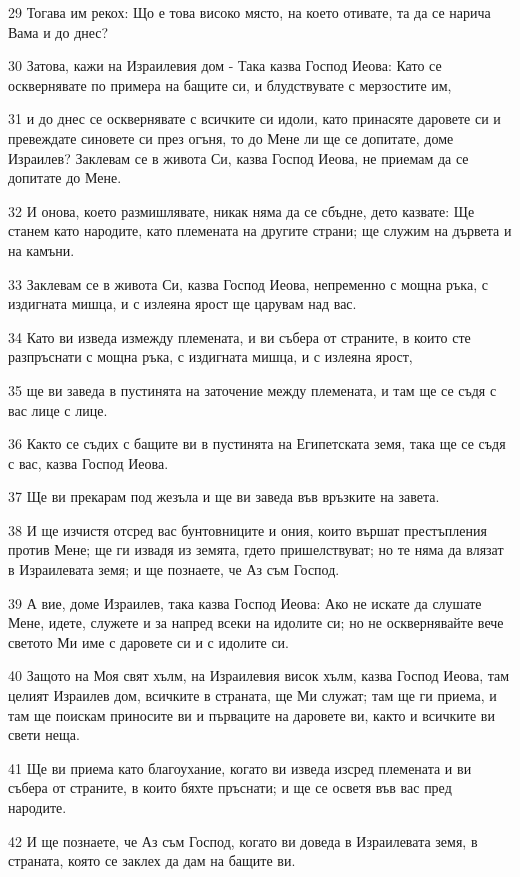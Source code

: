 \par 29 Тогава им рекох: Що е това високо място, на което отивате, та да се нарича Вама и до днес?
\par 30 Затова, кажи на Израилевия дом - Така казва Господ Иеова: Като се осквернявате по примера на бащите си, и блудствувате с мерзостите им,
\par 31 и до днес се осквернявате с всичките си идоли, като принасяте даровете си и превеждате синовете си през огъня, то до Мене ли ще се допитате, доме Израилев? Заклевам се в живота Си, казва Господ Иеова, не приемам да се допитате до Мене.
\par 32 И онова, което размишлявате, никак няма да се сбъдне, дето казвате: Ще станем като народите, като племената на другите страни; ще служим на дървета и на камъни.
\par 33 Заклевам се в живота Си, казва Господ Иеова, непременно с мощна ръка, с издигната мишца, и с излеяна ярост ще царувам над вас.
\par 34 Като ви изведа измежду племената, и ви събера от страните, в които сте разпръснати с мощна ръка, с издигната мишца, и с излеяна ярост,
\par 35 ще ви заведа в пустинята на заточение между племената, и там ще се съдя с вас лице с лице.
\par 36 Както се съдих с бащите ви в пустинята на Египетската земя, така ще се съдя с вас, казва Господ Иеова.
\par 37 Ще ви прекарам под жезъла и ще ви заведа във връзките на завета.
\par 38 И ще изчистя отсред вас бунтовниците и ония, които вършат престъпления против Мене; ще ги извадя из земята, гдето пришелствуват; но те няма да влязат в Израилевата земя; и ще познаете, че Аз съм Господ.
\par 39 А вие, доме Израилев, така казва Господ Иеова: Ако не искате да слушате Мене, идете, служете и за напред всеки на идолите си; но не осквернявайте вече светото Ми име с даровете си и с идолите си.
\par 40 Защото на Моя свят хълм, на Израилевия висок хълм, казва Господ Иеова, там целият Израилев дом, всичките в страната, ще Ми служат; там ще ги приема, и там ще поискам приносите ви и първаците на даровете ви, както и всичките ви свети неща.
\par 41 Ще ви приема като благоухание, когато ви изведа изсред племената и ви събера от страните, в които бяхте пръснати; и ще се осветя във вас пред народите.
\par 42 И ще познаете, че Аз съм Господ, когато ви доведа в Израилевата земя, в страната, която се заклех да дам на бащите ви.
